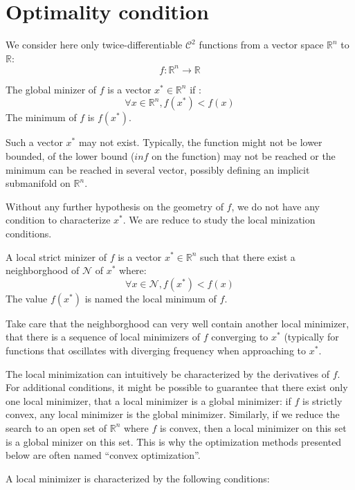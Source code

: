 \documentclass{book}
\begin{document}
\section{Optimality condition}

We consider here only twice-differentiable $\mathcal{C}^2$ functions from a vector space $\mathbb{R}^n$ to $\mathbb{R}$:
\[ f: \mathbb{R}^n \rightarrow \mathbb{R} \]

\begin{definition}
The global minizer of $f$ is a vector $x^*\in\mathbb{R}^n$ if :
\[ \forall x \in \mathbb{R}^n, f(x^*) < f(x) \]
The minimum of $f$ is $f(x^*)$.
\end{definition}

Such a vector $x^*$ may not exist. Typically, the function might not be lower bounded, of the lower bound ($inf$ on the function) may not be reached or the minimum can be reached in several vector, possibly defining an implicit submanifold on $\mathbb{R}^n$.

Without any further hypothesis on the geometry of $f$, we do not have any condition to characterize $x^*$. We are reduce to study the local minization conditions.

\begin{definition}
A local strict minizer of $f$ is a vector $x^*\in\mathbb{R}^n$ such that there exist a neighborghood of $\mathcal{N}$ of $x^*$ where:
\[ \forall x \in \mathcal{N}, f(x^*) < f(x) \]
The value $f(x^*)$ is named the local minimum of $f$.
\end{definition}

Take care that the neighborghood can very well contain another local minimizer, \mie that there is a sequence of local minimizers of $f$ converging to $x^*$ (typically for functions that oscillates with diverging frequency when approaching to $x^*$.

The local minimization can intuitively be characterized by the derivatives of $f$. For additional conditions, it might be possible to guarantee that there exist only one local minimizer, \mie that a local minimizer is a global minimizer: if $f$ is strictly convex, any local minimizer is the global minimizer. Similarly, if we reduce the search to an open set of $\mathbb{R}^n$ where $f$ is convex, then a local minimizer on this set is a global minizer on this set. This is why the optimization methods presented below are often named ``convex optimization''.

A local minimizer is characterized by the following conditions:
\end{document}
